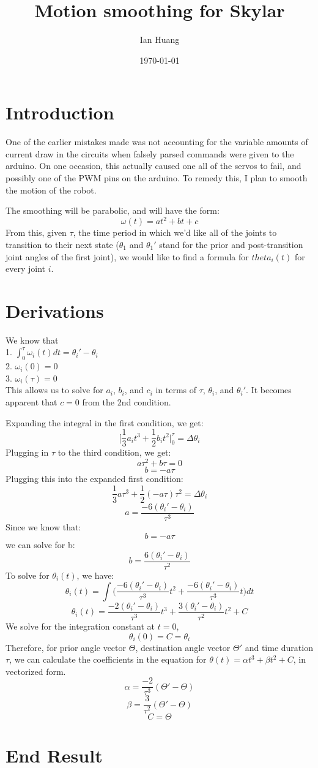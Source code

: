 \documentclass{article}
\title{Motion smoothing for Skylar}
\author{Ian Huang}
\date{\today}
\begin{document}
\maketitle
\section{Introduction}
One of the earlier mistakes made was not accounting for the variable amounts of
current draw in the circuits when falsely parsed commands were given to the
arduino. On one occasion, this actually caused one all of the servos to fail,
and possibly one of the PWM pins on the arduino. To remedy this, I plan to
smooth the motion of the robot.

The smoothing will be parabolic, and will have the form:\\
$$\omega(t)= at^2 + bt + c$$
From this, given $\tau$, the time period in which we'd like all of the joints
to transition to their next state ($\theta_1$ and $\theta_1'$ stand for the 
prior and post-transition joint angles of the first joint), we would like to
find a formula for $theta_i(t)$ for every joint $i$.

\section{Derivations}
We know that \\
1. $\int_{0}^{\tau}\omega_i(t) dt = \theta_i' - \theta_i$\\
2. $\omega_i(0) = 0$ \\
3. $\omega_i(\tau) = 0$\\

This allows us to solve for $a_i$, $b_i$, and $c_i$ in terms of $\tau$, 
$\theta_i$, and $\theta_i'$. It becomes apparent that $c = 0$ from the 2nd
condition.

Expanding the integral in the first condition, we get:
$$\biggr[ \frac{1}{3}a_it^3 + \frac{1}{2}b_it^2 \biggr|^\tau_0 = \Delta \theta_i$$
Plugging in $\tau$ to the third condition, we get:
$$a\tau^2 + b\tau = 0$$
$$b = -a\tau$$
Plugging this into the expanded first condition:
$$\frac{1}{3}a\tau^3 + \frac{1}{2}(-a\tau)\tau^2 = \Delta \theta_i$$
$$a = \frac{-6(\theta_i' - \theta_i)}{\tau^3}$$
Since we know that:
$$b=-a\tau$$
we can solve for b:
$$b = \frac{6(\theta_i' - \theta_i)}{\tau^2}$$
To solve for $\theta_i(t)$, we have:
$$\theta_i(t) = \int \biggr( \frac{-6(\theta_i' - \theta_i)}{\tau^3} t^2 + \frac{-6(\theta_i' - \theta_i)}{\tau^3} t \biggr) dt $$
$$\theta_i(t) = \frac{-2(\theta_i'-\theta_i)}{\tau^3} t^3 + \frac{3(\theta_i' - \theta_i)}{\tau^2} t^2 + C$$
We solve for the integration constant at $t = 0$,
$$\theta_i(0) = C = \theta_i $$
Therefore, for prior angle vector $\Theta$, destination angle vector
$\Theta'$ and time duration $\tau$, we can calculate the coefficients in the
equation for $\theta(t) = \alpha t^3 + \beta t^2 + C$, in vectorized form. \\
$$\alpha = \frac{-2}{\tau^3}(\Theta' - \Theta)$$
$$\beta = \frac{3}{\tau^2}(\Theta' - \Theta)$$
$$C = \Theta$$

\section{End Result}
\end{document}
